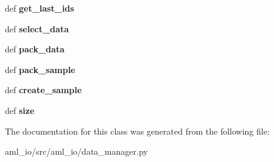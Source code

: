 \begin{DoxyCompactItemize}
\item 
\hypertarget{classaml__io_1_1data__manager_1_1_data_manager_a32b8004e8cbb08556e4b9d41c32bdca8}{def {\bfseries get\-\_\-last\-\_\-ids}}\label{classaml__io_1_1data__manager_1_1_data_manager_a32b8004e8cbb08556e4b9d41c32bdca8}

\item 
\hypertarget{classaml__io_1_1data__manager_1_1_data_manager_a68db105039430cd67dc8bc134ac96efe}{def {\bfseries select\-\_\-data}}\label{classaml__io_1_1data__manager_1_1_data_manager_a68db105039430cd67dc8bc134ac96efe}

\item 
\hypertarget{classaml__io_1_1data__manager_1_1_data_manager_ac46214f230b48817c42ac16fea49bbc8}{def {\bfseries pack\-\_\-data}}\label{classaml__io_1_1data__manager_1_1_data_manager_ac46214f230b48817c42ac16fea49bbc8}

\item 
\hypertarget{classaml__io_1_1data__manager_1_1_data_manager_ae2b159c742634357e7928e0b910dad61}{def {\bfseries pack\-\_\-sample}}\label{classaml__io_1_1data__manager_1_1_data_manager_ae2b159c742634357e7928e0b910dad61}

\item 
\hypertarget{classaml__io_1_1data__manager_1_1_data_manager_ae7183786c52e0d39ea0b3d65c52d10b0}{def {\bfseries create\-\_\-sample}}\label{classaml__io_1_1data__manager_1_1_data_manager_ae7183786c52e0d39ea0b3d65c52d10b0}

\item 
\hypertarget{classaml__io_1_1data__manager_1_1_data_manager_a5dd09279fe4be6d176f7e5292da99387}{def {\bfseries size}}\label{classaml__io_1_1data__manager_1_1_data_manager_a5dd09279fe4be6d176f7e5292da99387}

\end{DoxyCompactItemize}


The documentation for this class was generated from the following file\-:\begin{DoxyCompactItemize}
\item 
aml\-\_\-io/src/aml\-\_\-io/data\-\_\-manager.\-py\end{DoxyCompactItemize}
